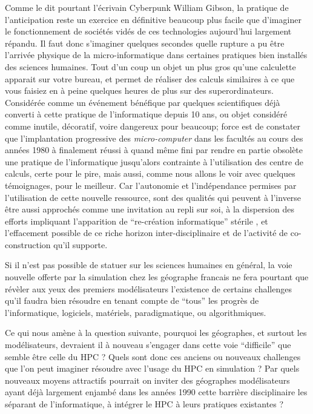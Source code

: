 Comme le dit pourtant l'écrivain Cyberpunk William Gibson, la pratique de l'anticipation reste un exercice en définitive beaucoup plus facile que d'imaginer le fonctionnement de sociétés vidés de ces technologies aujourd'hui largement répandu. Il faut donc s'imaginer quelques secondes quelle rupture a pu être l'arrivée physique de la micro-informatique dans certaines pratiques bien installés des sciences humaines. Tout d'un coup un objet un plus gros qu'une calculette apparait sur votre bureau, et permet de réaliser des calculs similaires à ce que vous faisiez en à peine quelques heures de plus sur des superordinateurs. Considérée comme un événement bénéfique par quelques scientifiques déjà converti à cette pratique de l'informatique depuis 10 ans, ou objet considéré comme inutile, décoratif, voire dangereux pour beaucoup; force est de constater que l'implantation progressive des \textit{micro-computer} dans les facultés au cours des années 1980 à finalement réussi à quand même fini par rendre en partie obsolète une pratique de l’informatique jusqu'alors contrainte à l'utilisation des centre de calculs, certe pour le pire, mais aussi, comme nous allons le voir avec quelques témoignages, pour le meilleur. Car l'autonomie et l'indépendance permises par l'utilisation de cette nouvelle ressource, sont des qualités qui peuvent à l'inverse être aussi approchés comme une invitation au repli sur soi, à la dispersion des efforts impliquant l'apparition de \enquote{re-création informatique} stérile , et l'effacement possible de ce riche horizon inter-disciplinaire et de l'activité de co-construction qu'il supporte.

Si il n'est pas possible de statuer sur les sciences humaines en général, la voie nouvelle offerte par la simulation chez les géographe francais ne fera pourtant que révèler aux yeux des premiers modélisateurs l'existence de certains challenges qu'il faudra bien résoudre en tenant compte de \enquote{tous} les progrès de l'informatique, logiciels, matériels, paradigmatique, ou algorithmiques.

Ce qui nous amène à la question suivante, pourquoi les géographes, et surtout les modélisateurs, devraient il à nouveau s’engager dans cette voie \enquote{difficile} que semble être celle du HPC ? Quels sont donc ces anciens ou nouveaux challenges que l'on peut imaginer résoudre avec l'usage du HPC en simulation ? Par quels nouveaux moyens attractifs pourrait on inviter des géographes modélisateurs ayant déjà largement enjambé dans les années 1990 cette barrière disciplinaire les séparant de l'informatique, à intégrer le HPC à leurs pratiques existantes ?

